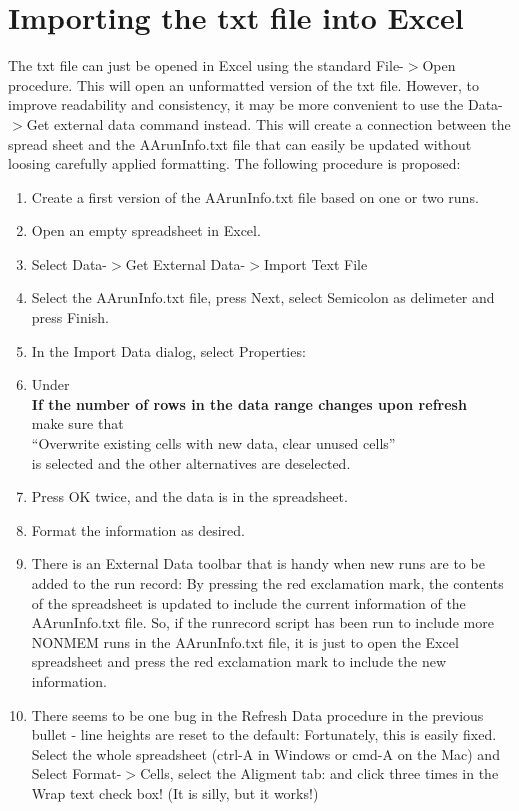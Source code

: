 \section{Importing the txt file into Excel}
The txt file can just be opened in Excel using the standard File-$>$Open procedure. This will open an unformatted version of the txt file. However, to improve readability and consistency, it may be more convenient to use the Data-$>$Get external data command instead. This will create a connection between the spread sheet and the AArunInfo.txt file that can easily be updated without loosing carefully applied formatting. The following procedure is proposed:
\begin{enumerate}
	\item Create a first version of the AArunInfo.txt file based on one or two runs.
	\item Open an empty spreadsheet in Excel.
	\item Select Data-$>$Get External Data-$>$Import Text File
	\item Select the AArunInfo.txt file, press Next, select Semicolon as delimeter and press Finish.
	\item In the Import Data dialog, select Properties:
	\item Under\\
    {\bf If the number of rows in the data range changes upon refresh}\\
    make sure that\\
    ``Overwrite existing cells with new data, clear unused cells''\\
    is selected and the other alternatives are deselected. 
	\item Press OK twice, and the data is in the spreadsheet.
	\item Format the information as desired.
	\item There is an External Data toolbar that is handy when new runs are to be added to the run record:
By pressing the red exclamation mark, the contents of the spreadsheet is updated to include the current information of the AArunInfo.txt file. So, if the runrecord script has been run to include more NONMEM runs in the AArunInfo.txt file, it is just to open the Excel spreadsheet and press the red exclamation mark to include the new information.
	\item There seems to be one bug in the Refresh Data procedure in the previous bullet - line heights are reset to the default:
Fortunately, this is easily fixed. Select the whole spreadsheet (ctrl-A in Windows or cmd-A on the Mac) and Select Format-$>$Cells, select the Aligment tab:
and click three times in the Wrap text check box! (It is silly, but it works!)
\end{enumerate}


